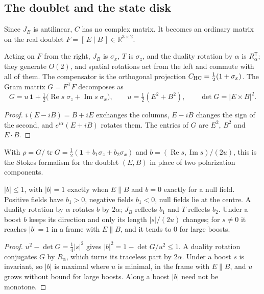 \subsection{The doublet and the state disk}

Since \(J_B\) is antilinear, \(C\) has no complex matrix.  It becomes an ordinary matrix on the real doublet \(F=[\,E\mid B\,]\in\mathbb R^{3\times2}\).

\begin{proposition}\label{prop:doublet}
Acting on \(F\) from the right, \(J_B\) is \(\sigma_x\), \(T\) is \(\sigma_z\), and the duality rotation by \(\alpha\) is \(R_\alpha^{\mathsf T}\); they generate
\(O(2)\), and spatial rotations act from the left and commute with all of them.  The compensator is the orthogonal projection
\(C_{\rm HC}=\tfrac12(1+\sigma_x)\).  The Gram matrix \(G=F^{\mathsf T}F\) decomposes as
\begin{equation}\label{eq:gram}
G=u\,\mathbf 1+\tfrac12\bigl(\operatorname{Re}s\;\sigma_z+\operatorname{Im}s\;\sigma_x\bigr),\qquad u=\tfrac12(E^2+B^2),\qquad
\det G=|E\times B|^2 .
\end{equation}
\end{proposition}

\begin{proof}
\(i(E-iB)=B+iE\) exchanges the columns, \(E-iB\) changes the sign of the second, and \(e^{i\alpha}(E+iB)\) rotates them.  The entries of \(G\) are
\(E^2\), \(B^2\) and \(E\cdot B\).
\end{proof}

With \(\rho=G/\operatorname{tr}G=\tfrac12(\mathbf 1+b_1\sigma_z+b_2\sigma_x)\) and \(b=(\operatorname{Re}s,\operatorname{Im}s)/(2u)\), this is the Stokes
formalism for the doublet \((E,B)\) in place of two polarization components.

\begin{proposition}\label{prop:disk}
\(|b|\le1\), with \(|b|=1\) exactly when \(E\parallel B\) and \(b=0\) exactly for a null field.  Positive fields have \(b_1>0\), negative fields
\(b_1<0\), null fields lie at the centre.  A duality rotation by \(\alpha\) rotates \(b\) by \(2\alpha\); \(J_B\) reflects \(b_1\) and \(T\) reflects \(b_2\).
Under a boost \(b\) keeps its direction and only its length \(|s|/(2u)\) changes; for \(s\neq0\) it reaches \(|b|=1\) in a frame with \(E\parallel B\),
and it tends to \(0\) for large boosts.
\end{proposition}

\begin{proof}
\(u^2-\det G=\tfrac14|s|^2\) gives \(|b|^2=1-\det G/u^2\le1\).  A duality rotation conjugates \(G\) by \(R_\alpha\), which turns its traceless part by
\(2\alpha\).  Under a boost \(s\) is invariant, so \(|b|\) is maximal where \(u\) is minimal, in the frame with \(E\parallel B\), and \(u\) grows without
bound for large boosts.  Along a boost \(|b|\) need not be monotone.
\end{proof}

